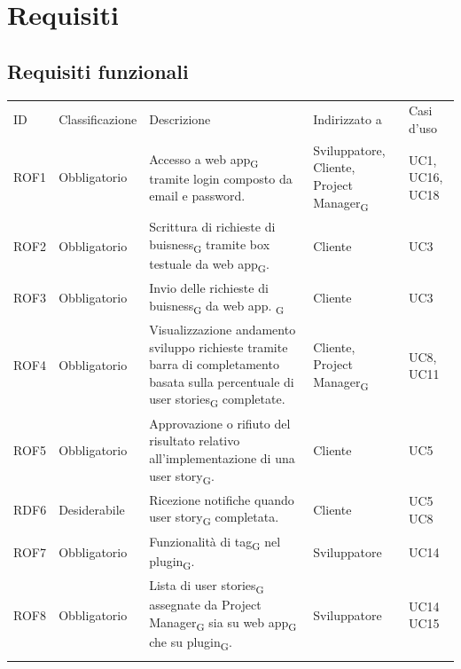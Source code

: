 \documentclass{article}
\begin{document}
\newpage
\section{Requisiti}
\subsection{Requisiti funzionali}
\begin{center}
    \begin{tabular}{|p{2cm}|p{3cm}|p{6cm}|p{3cm}|p{2cm}|}
    \rowcolor{Blue} 
\hline
ID & Classificazione & Descrizione & Indirizzato a&Casi d'uso  \\ 
\rowcolor{LightBlue}
\hline
ROF1&Obbligatorio & Accesso a web app\textsubscript{G} tramite login composto da email e password. & Sviluppatore, Cliente, Project Manager\textsubscript{G} & UC1, UC16, UC18 \\ 
\rowcolor{LighterBlue}
\hline
ROF2&Obbligatorio & Scrittura di richieste di buisness\textsubscript{G} tramite box testuale da web app\textsubscript{G}. & Cliente & UC3\\ 
\rowcolor{LightBlue}
\hline
ROF3&Obbligatorio & Invio delle richieste di buisness\textsubscript{G} da web app. \textsubscript{G} & Cliente & UC3\\
\hline
\rowcolor{LighterBlue}

ROF4&Obbligatorio & Visualizzazione andamento sviluppo richieste tramite barra di completamento basata sulla percentuale di user stories\textsubscript{G} completate. & Cliente, Project Manager\textsubscript{G} & UC8, UC11\\
\rowcolor{LightBlue}
\hline
ROF5&Obbligatorio & Approvazione o rifiuto del risultato relativo all'implementazione di una user story\textsubscript{G}. & Cliente & UC5\\
\hline
\rowcolor{LighterBlue}

RDF6&Desiderabile & Ricezione notifiche quando user story\textsubscript{G} completata. & Cliente & UC5 UC8\\
\hline
\rowcolor{LightBlue}
\hline
ROF7&Obbligatorio & Funzionalità di tag\textsubscript{G} nel plugin\textsubscript{G}.  & Sviluppatore & UC14\\
\hline
\rowcolor{LighterBlue}

ROF8&Obbligatorio & Lista di user stories\textsubscript{G} assegnate da Project Manager\textsubscript{G} sia su web app\textsubscript{G} che su plugin\textsubscript{G}. & Sviluppatore & UC14 UC15\\
\hline
\rowcolor{LightBlue}


\end{tabular}
\end{center}
\end{document}
